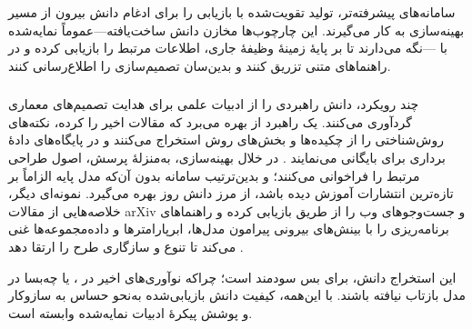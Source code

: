سامانه‌های پیشرفته‌تر، تولید تقویت‌شده با بازیابی را برای ادغام دانش بیرون از مسیر بهینه‌سازی به کار می‌گیرند. این چارچوب‌ها مخازن دانش ساخت‌یافته—عموماً  نمایه‌شده با —نگه می‌دارند تا بر پایهٔ زمینهٔ وظیفهٔ جاری، اطلاعات مرتبط را بازیابی کرده و در راهنماهای متنی تزریق کنند و بدین‌سان تصمیم‌سازی را اطلاع‌رسانی کنند.

\subsubsection{\protect{}}

چند رویکرد، دانش راهبردی را از ادبیات علمی برای هدایت تصمیم‌های معماری گردآوری می‌کنند. یک راهبرد از  بهره می‌برد که مقالات اخیر را  کرده، نکته‌های روش‌شناختی را از چکیده‌ها و بخش‌های روش استخراج می‌کنند و در پایگاه‌های دادهٔ برداری برای  بایگانی می‌نمایند \cite{Yang2025NADER}. در خلال بهینه‌سازی،  به‌منزلهٔ پرسش، اصول طراحی مرتبط را فراخوانی می‌کنند؛ و بدین‌ترتیب سامانه بدون آن‌که مدل پایه الزاماً بر تازه‌ترین انتشارات آموزش دیده باشد، از مرز دانش روز بهره می‌گیرد. نمونه‌ای دیگر، خلاصه‌هایی از مقالات arXiv و جست‌وجوهای وب را از طریق  بازیابی کرده و راهنماهای برنامه‌ریزی را با بینش‌های بیرونی پیرامون مدل‌ها، ابرپارامترها و داده‌مجموعه‌ها غنی می‌کند تا تنوع و سازگاری طرح را ارتقا دهد \cite{trirat2025automlagent}.

این استخراج دانش، برای  بس سودمند است؛ چراکه نوآوری‌های اخیر در ،  یا  چه‌بسا در  مدل بازتاب نیافته باشند. با این‌همه، کیفیت دانش بازیابی‌شده به‌نحو حساس به سازوکار  و پوشش پیکرهٔ ادبیات نمایه‌شده وابسته است.

\subsubsection{\protect{}}

